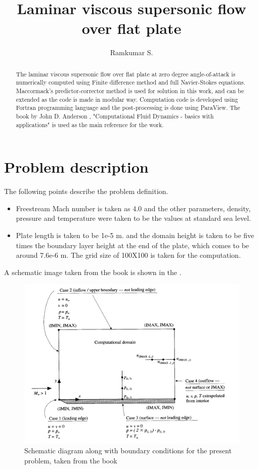 \documentclass[conf]{new-aiaa}
\title{Laminar viscous supersonic flow over flat plate}
\author{Ramkumar S.}
\begin{document}
\maketitle

\begin{abstract}
    The laminar viscous supersonic flow over flat plate at zero degree angle-of-attack
    is numerically computed using Finite difference method and full
    Navier-Stokes equations. Maccormack's predictor-corrector method is used
    for solution in this work, and can be extended as the code is made in
    modular way. Computation code is developed using Fortran programming language
    and the post-processing is done using ParaView. The book by John D. Anderson
    , "Computational Fluid Dynamics - basics with applications" is used as the
    main reference for the work.
\end{abstract}

\section{Problem description}
The following points describe the problem definition.
\begin{itemize}
    \item Freestream Mach number is taken as 4.0 and the other parameters,
        density, pressure and temperature were taken to be the values at
        standard sea level.
    \item Plate length is taken to be 1e-5 m. and the domain height is taken to
        be five times the boundary layer height at the end of the plate, which
        comes to be around 7.6e-6 m. The grid size of 100X100 is taken for
        the computation.
\end{itemize}
A schematic image taken from the book is shown in the .

\begin{figure}[!h]
   \centering
    \includegraphics[scale=0.3]{supportingFiles/schematic_diagram.png}
    \caption{Schematic diagram along with boundary conditions for the
    present problem, taken from the book}
    \label{schematic_diagram}
\end{figure}
\end{document}
